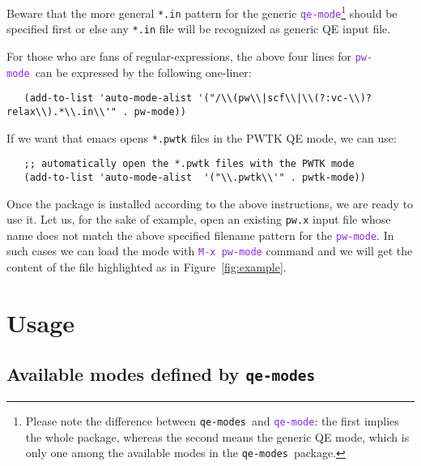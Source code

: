 \documentclass[12pt,a4paper]{article}
\def\qemodes{\texttt{qe-modes}}
\def\efn#1{\textcolor{BlueViolet}{\texttt{#1}}}
\def\qemode{\efn{qe-mode}}
\def\pwmode{\efn{pw-mode}}
\begin{document}
Beware that the more general \texttt{*.in} pattern for the generic
\qemode\footnote{Please note the difference between \qemodes\ and
  \qemode: the first implies the whole package, whereas the second
  means the generic QE mode, which is only one among the available
  modes in the \qemodes\ package.} should be specified first
or else any \texttt{*.in} file will be recognized as generic QE input
file.

For those who are fans of regular-expressions, the above four lines
for \pwmode\ can be expressed by the following one-liner:
{\footnotesize
  \begin{verbatim}
   (add-to-list 'auto-mode-alist '("/\\(pw\\|scf\\|\\(?:vc-\\)?relax\\).*\\.in\\'" . pw-mode))
\end{verbatim}
}
% 
\noindent
If we want that emacs opens \texttt{*.pwtk} files in the PWTK QE mode,
we can use:
\begin{flushleft}
{\color{red}
\verb+   ;; automatically open the *.pwtk files with the PWTK mode+}\\
\verb+   (add-to-list 'auto-mode-alist  '("\\.pwtk\\'" . pwtk-mode))+\\[1em]
\end{flushleft}

Once the package is installed according to the above instructions, we
are ready to use it. Let us, for the sake of example, open an existing
\texttt{pw.x} input file whose name does not match the above specified
filename pattern for the \pwmode. In such cases we can load the mode
with \efn{M-x pw-mode} command and we will get the content of the file
highlighted as in Figure~\ref{fig:example}.

\section{Usage}

\subsection{Available modes defined by \qemodes}
\end{document}
